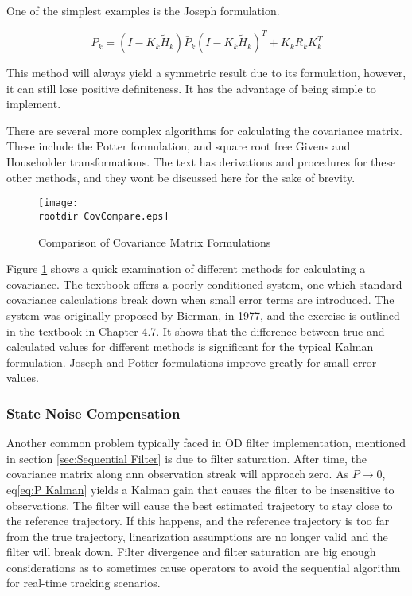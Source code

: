 \documentclass[12pt,a4paper,oneside]{article}
\numberwithin{equation}{section}   		%
\newcommand{\rootdir}{./Figures/}
\begin{document}
One of the simplest examples is the Joseph formulation.

\begin{equation}
	P_k = (I - K_k \tilde{H}_k) \bar{P}_k (I - K_k \tilde{H}_k)^T + K_kR_kK_k^T
	\label{eq:Joseph}
\end{equation}

This method will always yield a symmetric result due to its formulation, however, it can still lose positive definiteness. It has the advantage of being simple to implement.

There are several more complex algorithms for calculating the covariance matrix. These include the Potter formulation, and square root free Givens and Householder transformations. The text has derivations and procedures for these other methods, and they wont be discussed here for the sake of brevity. 

\begin{figure}[H]
	\centering
	\texttt{[image: \\rootdir CovCompare.eps]}
	\caption{Comparison of Covariance Matrix Formulations}
	\label{fig:CovCompare}
\end{figure}


Figure \ref{fig:CovCompare} shows a quick examination of different methods for calculating a covariance. The textbook offers a poorly conditioned system, one which standard covariance calculations break down when small error terms are introduced. The system was originally proposed by Bierman, in 1977, and the exercise is outlined in the textbook in Chapter 4.7. It shows that the difference between true and calculated values for different methods is significant for the typical Kalman formulation. Joseph and Potter formulations improve greatly for small error values. 




\subsubsection{State Noise Compensation}
\label{sec:SNC}

Another common problem typically faced in OD filter implementation, mentioned in section \ref{sec:Sequential Filter} is due to filter saturation. After time, the covariance matrix along ann observation streak will approach zero. As $P \rightarrow 0$, eq\eqref{eq:P Kalman} yields a Kalman gain that causes the filter to be insensitive to observations. The filter will cause the best estimated trajectory to stay close to the reference trajectory. If this happens, and the reference trajectory is too far from the true trajectory, linearization assumptions are no longer valid and the filter will break down. Filter divergence and filter saturation are big enough considerations as to sometimes cause operators to avoid the sequential algorithm for real-time tracking scenarios. 
\end{document}
